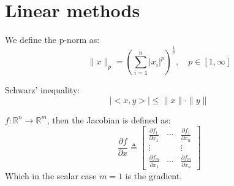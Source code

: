 \appendix

\section{Linear methods}
\begin{definition}
    We define the p-norm as:
    \begin{equation}
    \|x\|_{p}=\left(\sum_{i=1}^{n}\left|x_{i}\right|^{p}\right)^{\frac{1}{p}}, \quad p \in[1, \infty]
    \end{equation}
\end{definition}
\begin{theorem}
    Schwarz' inequality:
    \begin{equation}
        |<x, y>| \leq\|x\| \cdot\|y\|
    \end{equation}
\end{theorem}
\begin{definition}
    $f: \mathbb{R}^{n} \rightarrow \mathbb{R}^{m}$, then the Jacobian is defined as:
    \begin{equation}
    \frac{\partial f}{\partial x} \triangleq\left[\begin{array}{ccc}{\frac{\partial f_{1}}{\partial x_{1}}} & {\cdots} & {\frac{\partial f_{1}}{\partial x_{n}}} \\ {\vdots} & {} & {\vdots} \\ {\frac{\partial f_{m}}{\partial x_{1}}} & {\cdots} & {\frac{\partial f_{m}}{\partial x_{n}}}\end{array}\right]
    \end{equation}
    Which in the scalar case $m=1$ is the gradient.
\end{definition}